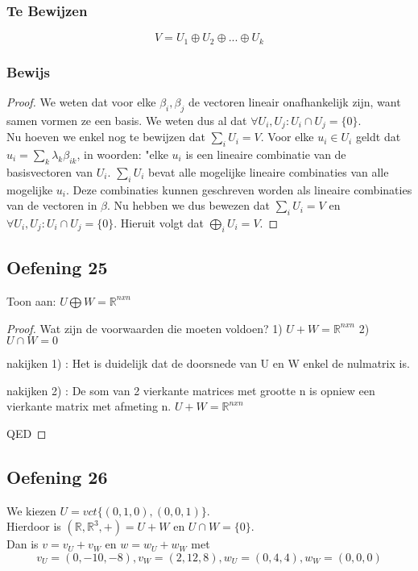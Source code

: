 \documentclass[lineaire_algebra_oplossingen.tex]{subfiles}
\begin{document}
\subsubsection*{Te Bewijzen}
\[
V = U_1 \oplus U_2 \oplus ... \oplus U_k
\]
\subsubsection*{Bewijs}
\begin{proof}
We weten dat voor elke $\beta_i,\beta_j$ de vectoren lineair onafhankelijk zijn, want samen vormen ze een basis. We weten dus al dat $\forall U_i,U_j: U_i \cap U_j = \{0\}$.\\
Nu hoeven we enkel nog te bewijzen dat $\sum_i U_i=V$. Voor elke $u_i \in U_i$ geldt dat $u_i = \sum_k\lambda_k\beta_{ik}$, in woorden: "elke $u_i$ is een lineaire combinatie van de basisvectoren van $U_i$. $\sum_i U_i$ bevat alle mogelijke lineaire combinaties van alle mogelijke $u_i$. Deze combinaties kunnen geschreven worden als lineaire combinaties van de vectoren in $\beta$. Nu hebben we dus bewezen dat $\sum_i U_i=V$ en $\forall U_i,U_j: U_i \cap U_j = \{0\}$. Hieruit volgt dat $\bigoplus_iU_i=V$.
\end{proof}



\subsection{Oefening 25}
Toon aan:
$ U \bigoplus W = \mathbb{R}^{n x n}$

\begin{proof}
Wat zijn de voorwaarden die moeten voldoen?
1) $ U + W = \mathbb{R}^{n x n}$
2) $ U \cap W = {0}$

nakijken 1) :
Het is duidelijk dat de doorsnede van U en W enkel de nulmatrix is.

nakijken 2) : 
De som van 2 vierkante matrices met grootte n is opniew een vierkante matrix met afmeting n. $U + W = \mathbb{R}^{n x n}$

QED

\end{proof}

\subsection{Oefening 26}
We kiezen $U = vct\{(0,1,0), (0,0,1)\}$.\\ Hierdoor is $(\mathbb{R}, \mathbb{R}^3, +) = U + W$ en $U \cap W = \{0\}$.\\
Dan is $v = v_U + v_W$ en $w = w_U + w_W$ met
\[
v_U = (0,-10,-8), 
v_W = (2,12,8), 
w_U = (0,4,4), 
w_W = (0,0,0)
\]
\end{document}
